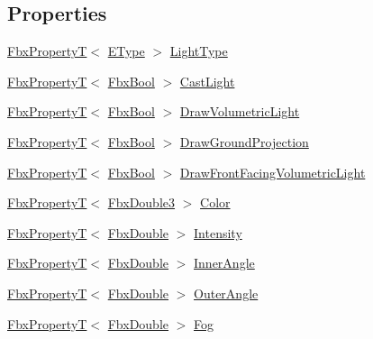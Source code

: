\subsection*{Properties}
\begin{DoxyCompactItemize}
\item 
\hyperlink{class_fbx_property_t}{Fbx\+PropertyT}$<$ \hyperlink{class_fbx_light_ace4ba495501bddf1341600bea7ed8daf}{E\+Type} $>$ \hyperlink{class_fbx_light_a2ce6e644dd2f9d7140c192d27d70ff93}{Light\+Type}
\item 
\hyperlink{class_fbx_property_t}{Fbx\+PropertyT}$<$ \hyperlink{fbxtypes_8h_a92e0562b2fe33e76a242f498b362262e}{Fbx\+Bool} $>$ \hyperlink{class_fbx_light_aab7e8386257e02ef8e3873f15d5fc690}{Cast\+Light}
\item 
\hyperlink{class_fbx_property_t}{Fbx\+PropertyT}$<$ \hyperlink{fbxtypes_8h_a92e0562b2fe33e76a242f498b362262e}{Fbx\+Bool} $>$ \hyperlink{class_fbx_light_a80eac74312e16415e3bfc8923a2ae98b}{Draw\+Volumetric\+Light}
\item 
\hyperlink{class_fbx_property_t}{Fbx\+PropertyT}$<$ \hyperlink{fbxtypes_8h_a92e0562b2fe33e76a242f498b362262e}{Fbx\+Bool} $>$ \hyperlink{class_fbx_light_a924e57f289e13900b4579d8e8ffdbc93}{Draw\+Ground\+Projection}
\item 
\hyperlink{class_fbx_property_t}{Fbx\+PropertyT}$<$ \hyperlink{fbxtypes_8h_a92e0562b2fe33e76a242f498b362262e}{Fbx\+Bool} $>$ \hyperlink{class_fbx_light_aac35b91a53647b958436f966ce65d7f7}{Draw\+Front\+Facing\+Volumetric\+Light}
\item 
\hyperlink{class_fbx_property_t}{Fbx\+PropertyT}$<$ \hyperlink{fbxtypes_8h_ae0a96f14cde566774c7553aa7523b7a7}{Fbx\+Double3} $>$ \hyperlink{class_fbx_light_abd8989416ecbe6a33adcb6bc09b2401b}{Color}
\item 
\hyperlink{class_fbx_property_t}{Fbx\+PropertyT}$<$ \hyperlink{fbxtypes_8h_a171e72a1c46fc15c1a6c9c31948c1c5b}{Fbx\+Double} $>$ \hyperlink{class_fbx_light_a3fc7a2684e3ab3cbd944825afd263433}{Intensity}
\item 
\hyperlink{class_fbx_property_t}{Fbx\+PropertyT}$<$ \hyperlink{fbxtypes_8h_a171e72a1c46fc15c1a6c9c31948c1c5b}{Fbx\+Double} $>$ \hyperlink{class_fbx_light_aced336586b1b3a1b8d685bf11ef21216}{Inner\+Angle}
\item 
\hyperlink{class_fbx_property_t}{Fbx\+PropertyT}$<$ \hyperlink{fbxtypes_8h_a171e72a1c46fc15c1a6c9c31948c1c5b}{Fbx\+Double} $>$ \hyperlink{class_fbx_light_ae4343cc9ecd82f2fde13d095b067fe68}{Outer\+Angle}
\item 
\hyperlink{class_fbx_property_t}{Fbx\+PropertyT}$<$ \hyperlink{fbxtypes_8h_a171e72a1c46fc15c1a6c9c31948c1c5b}{Fbx\+Double} $>$ \hyperlink{class_fbx_light_a85b9565571e88a5899fa7683ff77643c}{Fog}

\end{DoxyCompactItemize}

